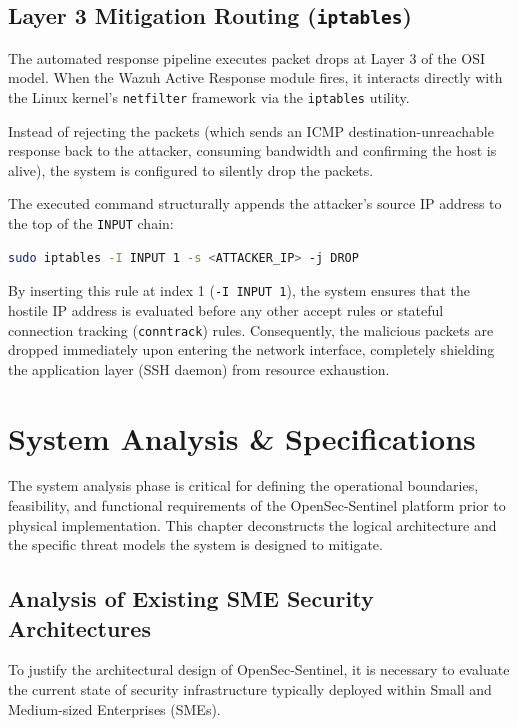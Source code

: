 \documentclass[12pt, a4paper]{report}
\begin{document}
	\section{Layer 3 Mitigation Routing (\texttt{iptables})}
	The automated response pipeline executes packet drops at Layer 3 of the OSI model. When the Wazuh Active Response module fires, it interacts directly with the Linux kernel's \texttt{netfilter} framework via the \texttt{iptables} utility.
	
	Instead of rejecting the packets (which sends an ICMP destination-unreachable response back to the attacker, consuming bandwidth and confirming the host is alive), the system is configured to silently drop the packets. 
	
	The executed command structurally appends the attacker's source IP address to the top of the \texttt{INPUT} chain:
	\begin{lstlisting}[language=bash]
		sudo iptables -I INPUT 1 -s <ATTACKER_IP> -j DROP
	\end{lstlisting}
	
	By inserting this rule at index 1 (\texttt{-I INPUT 1}), the system ensures that the hostile IP address is evaluated before any other accept rules or stateful connection tracking (\texttt{conntrack}) rules. Consequently, the malicious packets are dropped immediately upon entering the network interface, completely shielding the application layer (SSH daemon) from resource exhaustion.
	
	\chapter{System Analysis \& Specifications}
	\onehalfspacing
	
	The system analysis phase is critical for defining the operational boundaries, feasibility, and functional requirements of the OpenSec-Sentinel platform prior to physical implementation. This chapter deconstructs the logical architecture and the specific threat models the system is designed to mitigate.
	
	\section{Analysis of Existing SME Security Architectures}
	To justify the architectural design of OpenSec-Sentinel, it is necessary to evaluate the current state of security infrastructure typically deployed within Small and Medium-sized Enterprises (SMEs). 
	
\end{document}

